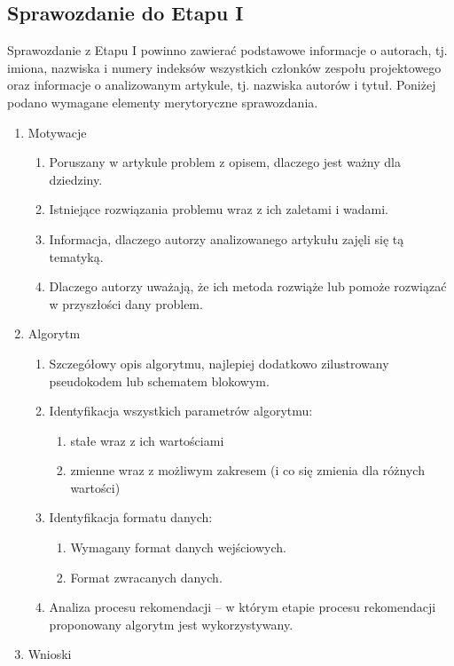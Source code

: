\documentclass{article}
\begin{document}
\subsection{Sprawozdanie do Etapu I}
Sprawozdanie z Etapu I powinno zawierać podstawowe informacje
o autorach, tj. imiona, nazwiska i numery indeksów wszystkich członków
zespołu projektowego oraz informacje o analizowanym artykule, tj. nazwiska
autorów i tytuł. 
Poniżej podano wymagane elementy merytoryczne sprawozdania.
\begin{enumerate}
    \item Motywacje
    \begin{enumerate}
        \item Poruszany w artykule problem z opisem, dlaczego jest ważny dla dziedziny.
        \item Istniejące rozwiązania problemu wraz z ich zaletami i wadami.
        \item Informacja, dlaczego autorzy analizowanego artykułu zajęli się tą tematyką.
        \item Dlaczego autorzy uważają, że ich metoda rozwiąże lub pomoże rozwiązać w przyszłości dany problem.
    \end{enumerate}
    \item Algorytm
    \begin{enumerate}
        \item Szczegółowy opis algorytmu, najlepiej dodatkowo zilustrowany pseudokodem lub schematem blokowym.
        \item Identyfikacja wszystkich parametrów algorytmu:
        \begin{enumerate}
            \item stałe wraz z ich wartościami
            \item zmienne wraz z możliwym zakresem (i co się zmienia dla różnych wartości)
        \end{enumerate}
        \item Identyfikacja formatu danych:
        \begin{enumerate}
            \item Wymagany format danych wejściowych.
            \item Format zwracanych danych.
        \end{enumerate}
        \item Analiza procesu rekomendacji – w którym etapie procesu rekomendacji proponowany algorytm jest wykorzystywany.
    \end{enumerate}
    \item Wnioski

\end{enumerate}
\end{document}
